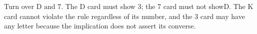 Turn over $\boxed{\text{D and 7}}$. The D card must show 3; the 7 card must not showD. The K card cannot violate the rule regardless of its number, and the 3 card may have any letter because the implication does not assert its converse.
